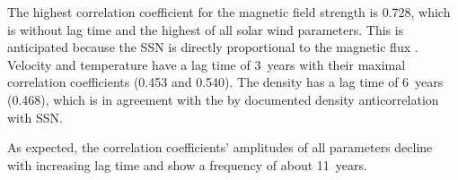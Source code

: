 The highest correlation coefficient for the magnetic field strength is 0.728, which is without lag time and the highest of all solar wind parameters. This is anticipated because the SSN is directly proportional to the magnetic flux \citep{Smith2003}.\\
Velocity and temperature have a lag time of 3~years with their maximal correlation coefficients (0.453 and 0.540). The density has a lag time of 6~years (0.468), which is in agreement with the by \citet{Bougeret1984} documented density anticorrelation with SSN.	%

As expected, the correlation coefficients' amplitudes of all parameters decline with increasing lag time and show a frequency of about 11~years.


